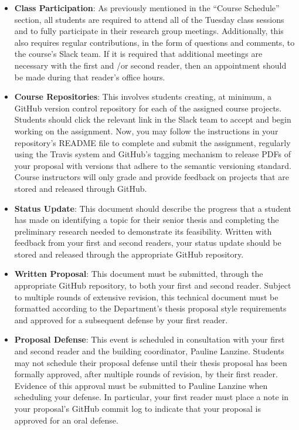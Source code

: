 \documentclass[11pt]{article}
\begin{document}
\begin{itemize}
  \itemsep -.25em

  \item {\bf Class Participation}: As previously mentioned in the ``Course Schedule'' section, all students are required to attend all of the Tuesday class sessions and to fully participate in their research group meetings. Additionally, this also requires regular contributions, in the form of questions and comments, to the course's Slack team. If it is required that additional meetings are necessary with the first and /or second reader, then  an appointment should be made during that reader's office hours.


  \item {\bf Course Repositories}: This involves students creating, at minimum, a GitHub version control repository for each of the assigned course projects. Students should click the relevant link in the Slack team to accept and begin working on the assignment. Now, you may follow the instructions in your repository's README file to complete and submit the assignment, regularly using the Travis system and GitHub's tagging mechanism to release PDFs of your proposal with versions that adhere to the semantic versioning standard. Course instructors will only grade and provide feedback on projects that are stored and released through GitHub.

  \item {\bf Status Update}: This document should describe the progress that a student has made on identifying a topic for their senior thesis and completing the preliminary research needed to demonstrate its feasibility. Written with feedback from your first and second readers, your status update should be stored and released through the appropriate GitHub repository.

  \item {\bf Written Proposal}: This document must be submitted, through the appropriate GitHub repository, to both your first and second reader. Subject to multiple rounds of extensive revision, this technical document must be formatted according to the Department's thesis proposal style requirements and approved for a subsequent defense by your first reader.

  \item {\bf Proposal Defense}: This event is scheduled in consultation with your first and second reader and the building coordinator, Pauline Lanzine. Students may not schedule their proposal defense until their thesis proposal has been formally approved, after multiple rounds of revision, by their first reader. Evidence of this approval must be submitted to Pauline Lanzine when scheduling your defense. In particular, your first reader must place a note in your proposal's GitHub commit log to indicate that your proposal is approved for an oral defense.


\end{itemize}
\end{document}
